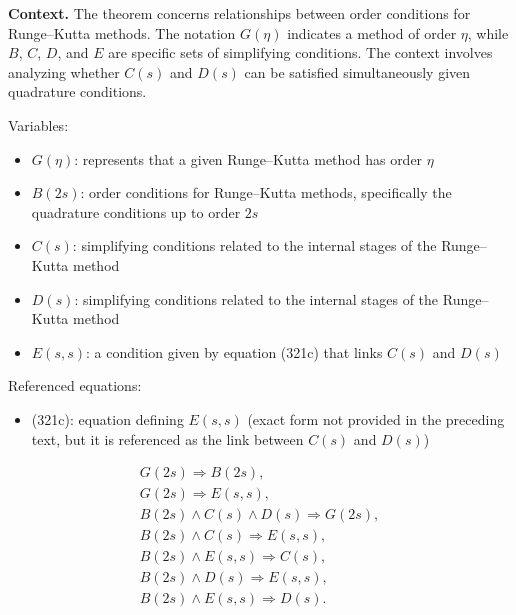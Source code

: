 \noindent\textbf{Context.}
The theorem concerns relationships between order conditions for Runge--Kutta methods. The notation \(G(\eta)\) indicates a method of order \(\eta\), while \(B\), \(C\), \(D\), and \(E\) are specific sets of simplifying conditions. The context involves analyzing whether \(C(s)\) and \(D(s)\) can be satisfied simultaneously given quadrature conditions.

Variables:
\begin{itemize}
    \item \(G(\eta)\): represents that a given Runge--Kutta method has order \(\eta\)
    \item \(B(2s)\): order conditions for Runge--Kutta methods, specifically the quadrature conditions up to order \(2s\)
    \item \(C(s)\): simplifying conditions related to the internal stages of the Runge--Kutta method
    \item \(D(s)\): simplifying conditions related to the internal stages of the Runge--Kutta method
    \item \(E(s, s)\): a condition given by equation (321c) that links \(C(s)\) and \(D(s)\)
\end{itemize}

Referenced equations:
\begin{itemize}
    \item (321c): equation defining \(E(s, s)\) (exact form not provided in the preceding text, but it is referenced as the link between \(C(s)\) and \(D(s)\))
\end{itemize}

\begin{theorem}

  \label{thm:342C}
  \uses{}
\begin{gather}
G(2s) \Rightarrow B(2s), \label{eq:342j} \\
G(2s) \Rightarrow E(s, s), \label{eq:342k} \\
B(2s) \land C(s) \land D(s) \Rightarrow G(2s), \label{eq:342l} \\
B(2s) \land C(s) \Rightarrow E(s, s), \label{eq:342m} \\
B(2s) \land E(s, s) \Rightarrow C(s), \label{eq:342n} \\
B(2s) \land D(s) \Rightarrow E(s, s), \label{eq:342o} \\
B(2s) \land E(s, s) \Rightarrow D(s). \label{eq:342p}
\end{gather}
\end{theorem}

